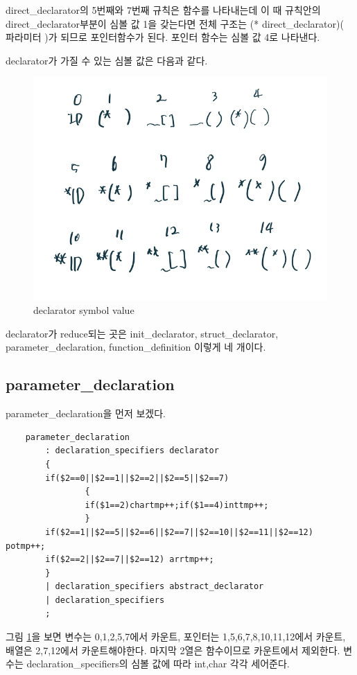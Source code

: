 \documentclass{oblivoir}
\begin{document}
direct\_declarator의 5번째와 7번째 규칙은 함수를 나타내는데 이 때 규칙안의  direct\_declarator부분이 심볼 값 1을 갖는다면 전체 구조는 (* direct\_declarator)( 파라미터 )가 되므로 포인터함수가 된다. 포인터 함수는 심볼 값 4로 나타낸다.

declarator가 가질 수 있는 심볼 값은 다음과 같다.
\begin{figure}[h]
    \centering
    \includegraphics[width=0.8\linewidth]{declarator_value.jpg}
    \caption{declarator symbol value}
    \label{fig:fig1}
\end{figure}

declarator가 reduce되는 곳은 init\_declarator, struct\_declarator, parameter\_declaration, function\_definition 이렇게 네 개이다.

\subsection{parameter\_declaration}
parameter\_declaration을 먼저 보겠다.
\begin{verbatim}
    parameter_declaration
        : declaration_specifiers declarator
        {
        if($2==0||$2==1||$2==2||$2==5||$2==7)
                {
                if($1==2)chartmp++;if($1==4)inttmp++;
                }
        if($2==1||$2==5||$2==6||$2==7||$2==10||$2==11||$2==12) potmp++;
        if($2==2||$2==7||$2==12) arrtmp++;
        }
        | declaration_specifiers abstract_declarator
        | declaration_specifiers
        ;
\end{verbatim}

그림 \ref{fig:fig1}을 보면 변수는 0,1,2,5,7에서 카운트, 포인터는 1,5,6,7,8,10,11,12에서 카운트, 배열은 2,7,12에서 카운트해야한다. 마지막 2열은 함수이므로 카운트에서 제외한다. 변수는 declaration\_specifiers의 심볼 값에 따라 int,char 각각 세어준다.
\end{document}
